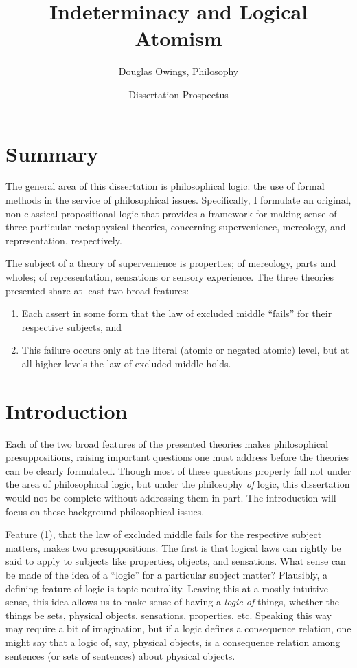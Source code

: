 \documentclass[12pt]{article}
\begin{document}
\renewcommand\refname{Selected Bibliography}
\title{Indeterminacy and Logical Atomism}
\author{Douglas Owings, Philosophy}
\date{Dissertation Prospectus}
\maketitle


\section*{Summary}
The general area of this dissertation is philosophical logic: the use of formal methods in the service of philosophical issues. Specifically, I formulate an original, non-classical propositional logic that provides a framework for making sense of three particular metaphysical theories, concerning supervenience, mereology, and representation, respectively.

The subject of a theory of supervenience is properties; of mereology, parts and wholes; of representation, sensations or sensory experience. The three theories presented share at least two broad features: 

\begin{enumerate}
\item Each assert in some form that the law of excluded middle ``fails'' for their respective subjects, and 
\item This failure occurs only at the literal (atomic or negated atomic) level, but at all higher levels the law of excluded middle holds. 
\end{enumerate}
\section*{Introduction}
Each of the two broad features of the presented theories makes philosophical presuppositions, raising important questions one must address before the theories can be clearly formulated. Though most of these questions properly fall not under the area of philosophical logic, but under the philosophy \emph{of} logic, this dissertation would not be complete without addressing them in part. The introduction will focus on these background philosophical issues.

Feature (1), that the law of excluded middle fails for the respective subject matters, makes two presuppositions. The first is that logical laws can rightly be said to apply to subjects like properties, objects, and sensations. What sense can be made of the idea of a ``logic'' for a particular subject matter? Plausibly, a defining feature of logic is topic-neutrality. Leaving this at a mostly intuitive sense, this idea allows us to make sense of having a \emph{logic of} things, whether the things be sets, physical objects, sensations, properties, etc. Speaking this way may require a bit of imagination, but if a logic defines a consequence relation, one might say that a logic of, say, physical objects, is a consequence relation among sentences (or sets of sentences) about physical objects.
\end{document}
